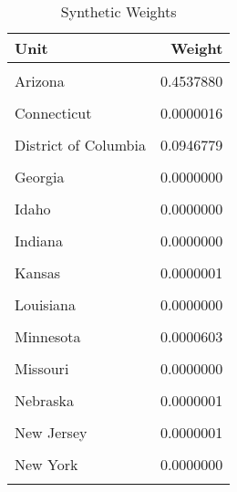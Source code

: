 \begin{table}[H]

\caption{\label{tab:unit_weight_table_colorado}Synthetic Weights}
\centering
\begin{tabular}[t]{lr}
\toprule
Unit & Weight\\
\midrule
\cellcolor{gray!6}{Alabama} & \cellcolor{gray!6}{0.0000000}\\
Arizona & 0.4537880\\
\cellcolor{gray!6}{Arkansas} & \cellcolor{gray!6}{0.0000000}\\
Connecticut & 0.0000016\\
\cellcolor{gray!6}{Delaware} & \cellcolor{gray!6}{0.0000000}\\
\addlinespace
District of Columbia & 0.0946779\\
\cellcolor{gray!6}{Florida} & \cellcolor{gray!6}{0.0000000}\\
Georgia & 0.0000000\\
\cellcolor{gray!6}{Hawaii} & \cellcolor{gray!6}{0.0000001}\\
Idaho & 0.0000000\\
\addlinespace
\cellcolor{gray!6}{Illinois} & \cellcolor{gray!6}{0.0000000}\\
Indiana & 0.0000000\\
\cellcolor{gray!6}{Iowa} & \cellcolor{gray!6}{0.0000000}\\
Kansas & 0.0000001\\
\cellcolor{gray!6}{Kentucky} & \cellcolor{gray!6}{0.0000000}\\
\addlinespace
Louisiana & 0.0000000\\
\cellcolor{gray!6}{Maryland} & \cellcolor{gray!6}{0.0000000}\\
Minnesota & 0.0000603\\
\cellcolor{gray!6}{Mississippi} & \cellcolor{gray!6}{0.0000000}\\
Missouri & 0.0000000\\
\addlinespace
\cellcolor{gray!6}{Montana} & \cellcolor{gray!6}{0.0000000}\\
Nebraska & 0.0000001\\
\cellcolor{gray!6}{New Hampshire} & \cellcolor{gray!6}{0.3754123}\\
New Jersey & 0.0000001\\
\cellcolor{gray!6}{New Mexico} & \cellcolor{gray!6}{0.0000000}\\
\addlinespace
New York & 0.0000000\\
\cellcolor{gray!6}{North Carolina} & \cellcolor{gray!6}{0.0000000}\\

\end{tabular}
\end{table}

